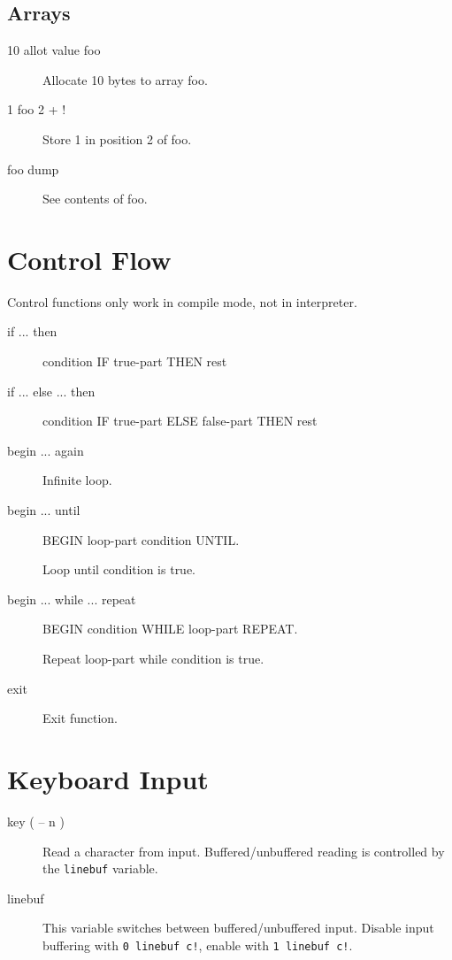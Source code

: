 \subsection{Arrays}

\begin{description}
\item[10 allot value foo] Allocate 10 bytes to array foo.
\item[1 foo 2 + !] Store 1 in position 2 of foo.
\item[foo dump] See contents of foo.
\end{description}


\section{Control Flow}

Control functions only work in compile mode, not in interpreter.

\begin{description}
\item[if ... then]

condition IF true-part THEN rest

\item[if ... else ... then]

condition IF true-part ELSE false-part THEN rest

\item[begin ... again]

Infinite loop.

\item[begin ... until]

BEGIN loop-part condition UNTIL.

Loop until condition is true.

\item[begin ... while ... repeat]

BEGIN condition WHILE loop-part REPEAT.

Repeat loop-part while condition is true.

\item[exit]

Exit function.

\end{description}

\section{Keyboard Input}

\begin{description}
\item[key ( -- n )]

Read a character from input. Buffered/unbuffered reading is controlled by the \texttt{linebuf} variable.

\item[linebuf]

This variable switches between buffered/unbuffered input. Disable input buffering with \texttt{0 linebuf c!}, enable with \texttt{1 linebuf c!}.

\end{description}

